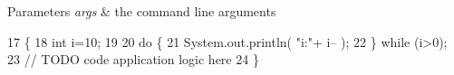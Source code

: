 \begin{DoxyParams}{Parameters}
{\em args} & the command line arguments \\
\hline
\end{DoxyParams}

\begin{DoxyCode}
17                                            \{
18         \textcolor{keywordtype}{int} i=10;
19  
20             \textcolor{keywordflow}{do} \{
21                   System.out.println( \textcolor{stringliteral}{"i:"}+ i-- );
22             \} \textcolor{keywordflow}{while} (i>0);
23         \textcolor{comment}{// TODO code application logic here}
24     \}
\end{DoxyCode}
